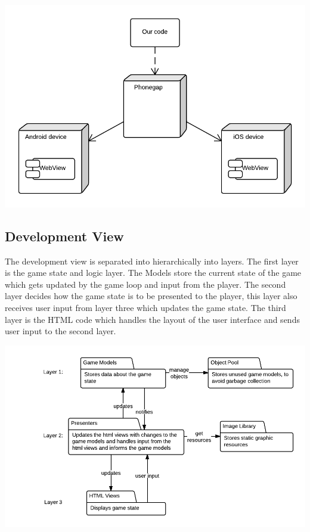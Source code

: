 	\includegraphics[width=\textwidth]{pictures/deployment_diagram}

\subsection*{Development View}

	The development view is separated into hierarchically into layers. The first layer is the game state 
	and logic layer. The Models store the current state of the game which gets updated by the game loop 
	and input from the player. The second layer decides how the game state is to be presented to the 
	player, this layer also receives user input from layer three which updates the game state. The third 
	layer is the HTML code which handles the layout of the user interface and sends user input to the
	second layer.

	\includegraphics[width=\textwidth]{pictures/development_view}
